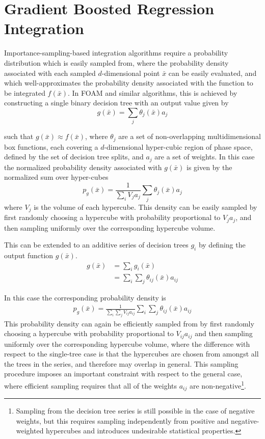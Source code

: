 \documentclass[a4paper,11pt]{article}
\begin{document}
\section{Gradient Boosted Regression Integration}
Importance-sampling-based integration algorithms require a probability distribution which is easily sampled from, where the probability density associated with each sampled $d$-dimensional point $\bar x$ can be easily evaluated, and which well-approximates the probability density associated with the function to be integrated $f(\bar x)$.  In FOAM and similar algorithms, this is achieved by constructing a single binary decision tree with an output value given by
\begin{equation}
 g(\bar x) = \sum_{j} \theta_j(\bar x) a_j
\end{equation}

such that $g(\bar x)\approx f(\bar x)$, where $\theta_j$ are a set of non-overlapping multidimensional box functions, each covering a $d$-dimensional hyper-cubic region of phase space, defined by the set of decision tree splits, and $a_j$ are a set of weights.  In this case the normalized probability density associated with $g(\bar x)$ is given by the normalized sum over hyper-cubes
\begin{equation}
 p_g(\bar x) = \frac{1}{\sum_i V_j a_j}\sum_{j} \theta_j(\bar x) a_j
\end{equation}
where $V_j$ is the volume of each hypercube.  This density can be easily sampled by first randomly choosing a hypercube with probability proportional to $V_j a_j$, and then sampling uniformly over the corresponding hypercube volume.

This can be extended to an additive series of decision trees $g_i$ by defining the output function $g(\bar x)$.
\begin{align}
 g(\bar x) &= \sum_i g_i(\bar x)\\
	   &= \sum_i \sum_j \theta_{ij}(\bar x) a_{ij}
\end{align}

In this case the corresponding probability density is
\begin{align}
 p_g(\bar x) = \frac{1}{\sum_i \sum_j V_{ij} a_{ij}}\sum_i \sum_j \theta_{ij}(\bar x) a_{ij}
\end{align}
This probability density can again be efficiently sampled from by first randomly choosing a hypercube with probability proportional to $V_{ij} a_{ij}$ and then sampling uniformly over the corresponding hypercube volume, where the difference with respect to the single-tree case is that the hypercubes are chosen from amongst all the trees in the series, and therefore may overlap in general.  This sampling procedure imposes an important constraint with respect to the general case, where efficient sampling requires that all of the weights $a_{ij}$ are non-negative\footnote{Sampling from the decision tree series is still possible in the case of negative weights, but this requires sampling independently from positive and negative-weighted hypercubes and introduces undesirable statistical properties.}.
\end{document}
